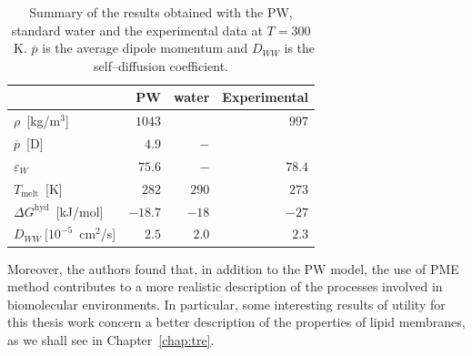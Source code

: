 \begin{table}
	\centering
	\begin{tabular}{lrrr}
		\toprule
		\,	& \acs{PW} &  \martini water & Experimental \\ \toprule
		$\rho$~[kg/m$^3$]				& $1043$  &   		& $997$		\\ \midrule
		$\overline{p}$~[D] 				& $4.9$   & $-$ 	& 		    \\ \midrule
		$\varepsilon_{W}$ 				& $75.6$  & $-$ 	& $78.4$	\\ \midrule
		$T_\text{melt}$~[K] 			& $282$   & $290$ 	& $273$		\\ \midrule
		$\Delta G^\text{hyd}$~[kJ/mol] 	& $-18.7$ &	$-18$	& $-27$		\\ \midrule%
		$D_{WW}~[10^{-5}$~cm$^2$/s]		& $2.5$   & $2.0$   & $2.3$		\\ \bottomrule
	\end{tabular}
	\caption{Summary of the results obtained with the \acs{PW}, standard \martini water and the experimental data at $T=300$~K. $\overline{p}$ is the average dipole momentum and $D_{WW}$ is the self--diffusion coefficient.}
	\label{tab:PWRes}
\end{table}

Moreover, the authors found that, in addition to the \ac{PW} model, the use of \ac{PME} method contributes to a 
more realistic description of the processes involved in biomolecular environments. In particular, some 
interesting results of utility for this thesis work concern a better description of the properties of lipid 
membranes, as we shall see in Chapter~\ref{chap:tre}.
			

